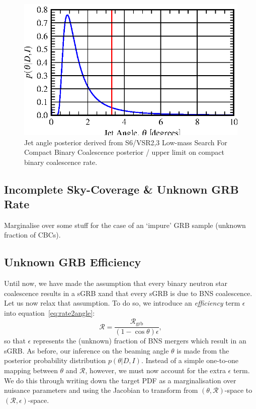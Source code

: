 \documentclass[twocolumn,nofootinbib]{revtex4}
\newcommand{\grbrate}{{{\mathcal R}_{\mathrm{grb}}}}
\newcommand{\cbcrate}{{{\mathcal R}}}
\begin{document}
\begin{figure}
\includegraphics{jet_angle_posterior_s6UL.eps}
\caption{Jet angle posterior derived from S6/VSR2,3 Low-mass Search For Compact Binary
Coalescence posterior / upper limit on compact binary coalescence
rate.\label{fig:jetPosterior}}
\end{figure}

\subsection{Incomplete Sky-Coverage \& Unknown GRB Rate}
Marginalise over some stuff for the case of an `impure' GRB sample (unknown
fraction of CBCs).
\\

\subsection{Unknown GRB Efficiency}
Until now, we have made the assumption that every binary neutron star
coalescence results in a sGRB xand that every sGRB is due to BNS coalescence.
Let us now relax that assumption.  To do so, we introduce an \emph{efficiency}
term $\epsilon$ into equation~\ref{eq:rate2angle}:
\begin{equation}\label{eq:rate2angle_epsilon}
\cbcrate=\frac{\grbrate}{(1-\cos \theta)\epsilon},
\end{equation}
%
so that $\epsilon$ represents the (unknown) fraction of BNS mergers which result
in an sGRB.  As before, our inference on the beaming angle $\theta$ is made from
the posterior probability distribution $p(\theta|D,I)$.  Instead of a simple
one-to-one mapping between $\theta$ and $\cbcrate$, however, we must now account
for the extra $\epsilon$ term.  We do this through writing down the target PDF
as a marginalisation over nuisance parameters and using the Jacobian to
transform from $(\theta,\cbcrate)$-space to $(\cbcrate,\epsilon)$-space.
\end{document}
